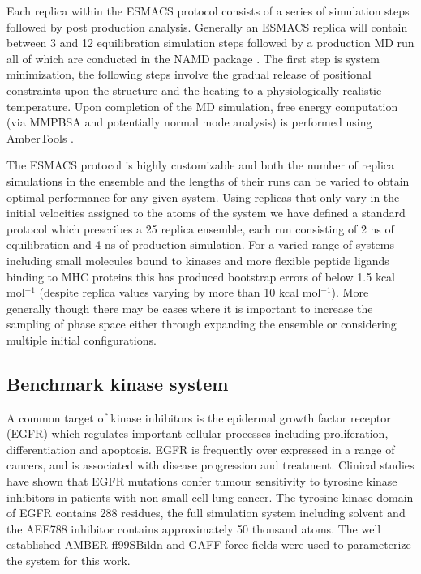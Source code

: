 Each replica within the ESMACS protocol consists of a series of simulation
steps followed by post production analysis. Generally an ESMACS replica will
contain between 3 and 12 equilibration simulation steps followed by a
production MD run all of which are conducted in the NAMD package
\cite{Phillips2005}. The first step is system minimization, the following
steps involve the gradual release of positional constraints upon the structure
and the heating to a physiologically realistic temperature. Upon completion of
the MD simulation, free energy computation (via MMPBSA and potentially normal
mode analysis) is performed using AmberTools \cite{amber14, Case2005,
MillerIII2012}.

The ESMACS protocol is highly customizable and both the number of replica 
simulations in the ensemble and the lengths of their runs can be varied to obtain 
optimal performance for any given system.
Using replicas that only vary in the initial velocities assigned to the atoms of 
the system we have defined a standard protocol which prescribes a 25 replica ensemble, 
each run consisting of 2 ns of equilibration and 4 ns of production simulation.
For a varied range of systems including small molecules bound to kinases and
more flexible peptide ligands binding to MHC proteins this has produced bootstrap 
errors of below 1.5 kcal mol$^{-1}$ (despite replica values varying by more than 10 
kcal mol$^{-1}$). More generally though there may be cases where it is important to 
increase the sampling of phase space either through expanding the ensemble or considering 
multiple initial configurations.

\subsection{Benchmark kinase system}

A common target of kinase inhibitors is the epidermal growth factor receptor (EGFR) which regulates important cellular processes including proliferation, differentiation and apoptosis.
EGFR is frequently over expressed in a range of cancers, and is associated with disease progression and treatment. 
Clinical studies have shown that EGFR mutations confer tumour sensitivity to tyrosine kinase inhibitors in patients with non-small-cell lung cancer.
The tyrosine kinase domain of EGFR contains 288 residues, the full simulation system including solvent and the AEE788 inhibitor contains approximately 50 thousand atoms.
The well established AMBER ff99SBildn and GAFF force fields \cite{Maier2015, Wang2004} were used to parameterize the system for this work.
